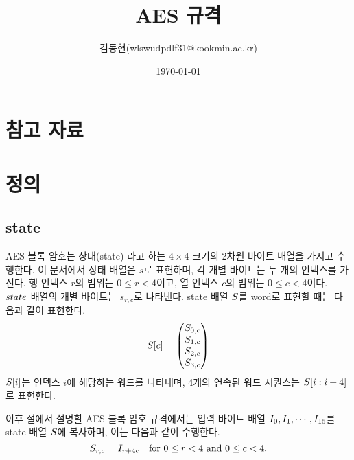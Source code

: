 \documentclass{article}
\title{AES 규격}
\author{김동현(wlswudpdlf31@kookmin.ac.kr)}
\date{\today}
\begin{document}
\maketitle
\tableofcontents

\newpage
\section{참고 자료}

\newpage
\section{정의}

\subsection{state}

AES 블록 암호는 상태(state) 라고 하는 $4 \times 4$ 크기의 2차원 바이트 배열을
가지고 수행한다. 이 문서에서 상태 배열은 $s$로 표현하며, 각 개별 바이트는
두 개의 인덱스를 가진다. 행 인덱스 $r$의 범위는 $0 \le r < 4$이고, 열 인덱스
$c$의 범위는 $0 \le c < 4$이다. $state$ 배열의 개별 바이트는 $s_{r, c}$로
나타낸다.
state 배열 $S$를 word로 표현할 때는 다음과 같이 표현한다.
$$
    S[c] = \begin{pmatrix}
        S_{0, c} \\
        S_{1, c} \\
        S_{2, c} \\
        S_{3, c}
    \end{pmatrix}
$$
$S[i]$는 인덱스 $i$에 해당하는 워드를 나타내며, 4개의 연속된 워드 시퀀스는
$S[i:i+4]$로 표현한다.

이후 절에서 설명할 AES 블록 암호 규격에서는 입력 바이트 배열 $I_0, I_1,
\cdots, I_{15}$를 state 배열 $S$에 복사하며, 이는 다음과 같이 수행한다.
$$
    S_{r, c} = I_{r + 4c} \quad \text{for } 0 \le r < 4 \text{ and } 0 \le c < 4.
$$
\end{document}

